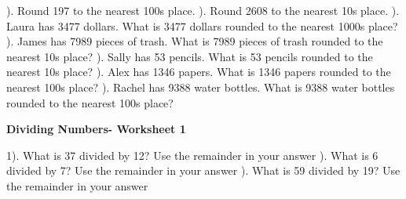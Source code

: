 \documentclass{article}%
\begin{document}
\newline%
\newline%
). Round 197 to the nearest 100s place.%
\newline%
\newline%
). Round 2608 to the nearest 10s place.%
\newline%
\newline%
). Laura has 3477 dollars. What is 3477 dollars rounded to the nearest 1000s place?%
\newline%
\newline%
). James has 7989 pieces of trash. What is 7989 pieces of trash rounded to the nearest 10s place?%
\newline%
\newline%
). Sally has 53 pencils. What is 53 pencils rounded to the nearest 10s place?%
\newline%
\newline%
). Alex has 1346 papers. What is 1346 papers rounded to the nearest 100s place?%
\newline%
\newline%
). Rachel has 9388 water bottles. What is 9388 water bottles rounded to the nearest 100s place?%
\newline%
\newline%
\newline%
\pagebreak%
\large%
\begin{center}%
\textbf{Dividing Numbers- Worksheet 1}%
\newline%
\end{center} \normalsize%
1). What is 37 divided by 12? Use the remainder in your answer%
\newline%
\newline%
). What is 6 divided by 7? Use the remainder in your answer%
\newline%
\newline%
). What is 59 divided by 19? Use the remainder in your answer%
\newline%
\newline%
\newline%
\end{document}
